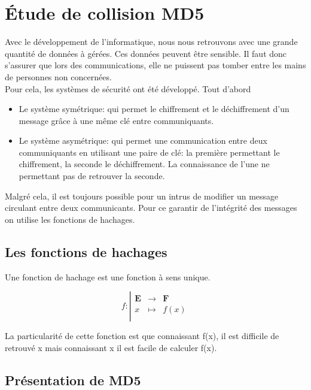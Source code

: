 \documentclass[a4paper,11pt,french]{article}
\begin{document}
\newpage
\section{\'Etude de collision MD5}

Avec le développement de l'informatique, nous nous retrouvons avec une grande quantité de données à gérées. Ces données peuvent \^etre sensible. Il faut donc s'assurer que lors des communications, elle ne puissent pas tomber entre les mains de personnes non concernées.\\

Pour cela, les systèmes de sécurité ont été développé. Tout d'abord \begin{itemize}
\item Le système symétrique: qui permet le chiffrement et le déchiffrement d'un message gr\^ace à une m\^eme clé  entre communiquants.
\item Le système asymétrique: qui permet une communication entre deux communiquants en utilisant une paire de clé: la première permettant le chiffrement, la seconde le déchiffrement. La connaissance de l'une ne permettant pas de retrouver la seconde.
\end{itemize}
\vspace{.5cm}
Malgré cela, il est toujours possible pour un intrus de modifier un message circulant entre deux communicants. Pour ce garantir de l'intégrité des messages on utilise les fonctions de hachages.

\subsection{Les fonctions de hachages}
Une fonction de hachage est une fonction à sens unique.

\begin{displaymath}
f:
\left|
  \begin{array}{rcl}
    \mathbf{E} & \longrightarrow &\mathbf{F} \\
    x & \longmapsto & f(x) \\
  \end{array}
\right.
\end{displaymath}

La particularité de cette fonction est que connaissant f(x), il est difficile de retrouvé x mais connaissant x il est facile de calculer f(x).

\subsection{Présentation de MD5}

\end{document}

